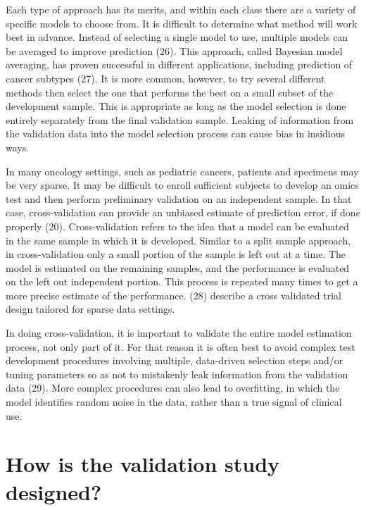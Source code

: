 \documentclass[11pt]{article}
\begin{document}
Each type of approach has its merits, and within each class there are a
variety of specific models to choose from. It is difficult to determine
what method will work best in advance. Instead of selecting a single
model to use, multiple models can be averaged to improve prediction
(26). This approach, called Bayesian model averaging, has proven
successful in different applications, including prediction of cancer
subtypes (27). It is more common, however, to try several different
methods then select the one that performs the best on a small subset of
the development sample. This is appropriate as long as the model
selection is done entirely separately from the final validation sample.
Leaking of information from the validation data into the model selection
process can cause bias in insidious ways.

In many oncology settings, such as pediatric cancers, patients and
specimens may be very sparse. It may be difficult to enroll sufficient
subjects to develop an omics test and then perform preliminary
validation on an independent sample. In that case, cross-validation can
provide an unbiased estimate of prediction error, if done properly (20).
Cross-validation refers to the idea that a model can be evaluated in the
same sample in which it is developed. Similar to a split sample
approach, in cross-validation only a small portion of the sample is left
out at a time. The model is estimated on the remaining samples, and the
performance is evaluated on the left out independent portion. This
process is repeated many times to get a more precise estimate of the
performance. (28) describe a cross validated trial design tailored for
sparse data settings.

In doing cross-validation, it is important to validate the entire model
estimation process, not only part of it. For that reason it is often
best to avoid complex test development procedures involving multiple,
data-driven selection steps and/or tuning parameters so as not to
mistakenly leak information from the validation data (29). More complex
procedures can also lead to overfitting, in which the model identifies
random noise in the data, rather than a true signal of clinical use.

\section{How is the validation study
designed?}\label{how-is-the-validation-study-designed}
\end{document}
